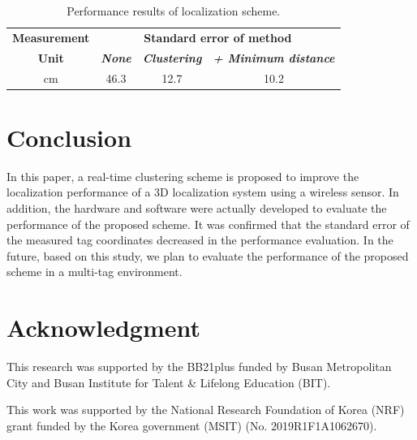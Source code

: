 \documentclass[conference]{IEEEtran}
\begin{document}
\begin{table}[htbp]
    \caption{Performance results of localization scheme.}
    \begin{center}
        \begin{tabular}{|c|c|c|c|}
            \hline
            \textbf{Measurement} & \multicolumn{3}{|c|}{\textbf{Standard error of method}}                                                                       \\
            \cline{2-4}
            \textbf{Unit}        & \textbf{\textit{None}}                                  & \textbf{\textit{Clustering}} & \textbf{\textit{+ Minimum distance}} \\
            \hline
            cm                   & 46.3                                                    & 12.7                         & 10.2                                 \\
            \hline
        \end{tabular}
        \label{tab1}
    \end{center}
\end{table}

\section{Conclusion}

In this paper, a real-time clustering scheme is proposed to improve the localization performance of a 3D localization system using a wireless sensor. In addition, the hardware and software were actually developed to evaluate the performance of the proposed scheme. It was confirmed that the standard error of the measured tag coordinates decreased in the performance evaluation. In the future, based on this study, we plan to evaluate the performance of the proposed scheme in a multi-tag environment.

\section*{Acknowledgment}

This research was supported by the BB21plus funded by Busan Metropolitan City and Busan Institute for Talent \& Lifelong Education (BIT).

This work was supported by the National Research Foundation of Korea (NRF) grant funded by the Korea government (MSIT) (No. 2019R1F1A1062670).
\end{document}
